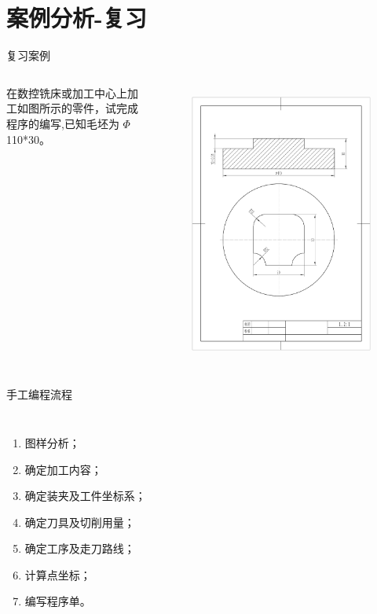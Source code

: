 \documentclass[UTF8,zihao=-4]{ctexbeamer}
\begin{document}
\section{案例分析-复习}
\begin{frame}{复习案例}
     \begin{columns}
        在数控铣床或加工中心上加工如图所示的零件，试完成程序的编写,已知毛坯为 $\Phi$ 110*30。

\begin{figure}
    \centering
    \includegraphics[width=0.8\linewidth,trim=50 150 50 100,clip]{image/5-1.jpg}
    \label{fig:5-1}
\end{figure}
    \end{columns}
\end{frame}

\begin{frame}{手工编程流程}
    \begin{columns}
\begin{enumerate}
    \item 图样分析；
    \item 确定加工内容；
    \item 确定装夹及工件坐标系；
    \item 确定刀具及切削用量；
    \item 确定工序及走刀路线；
    \item 计算点坐标；
    \item 编写程序单。
\end{enumerate}
    \end{columns}
\end{frame}
\end{document}
